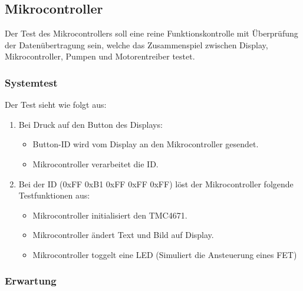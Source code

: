\subsection{Mikrocontroller}\label{subsec:Hardware_Mikrocontroller}
Der Test des Mikrocontrollers soll eine reine Funktionskontrolle mit Überprüfung der Datenübertragung sein, welche das Zusammenspiel zwischen Display, Mikrocontroller, Pumpen und Motorentreiber testet. 

\subsubsection{Systemtest}\label{subsubsec:Hardware_Systemtest}

Der Test sieht wie folgt aus:

\begin{enumerate}
\item Bei Druck auf den Button des Displays:
\begin{itemize}
\item Button-ID wird vom Display an den Mikrocontroller gesendet.
\item Mikrocontroller verarbeitet die ID.
\\
\end{itemize}
\item Bei der ID (0xFF 0xB1 0xFF 0xFF 0xFF) löst der Mikrocontroller folgende Testfunktionen aus:
\begin{itemize}
\item Mikrocontroller initialisiert den TMC4671.
\item Mikrocontroller ändert Text und Bild auf Display.
\item Mikrocontroller toggelt eine LED (Simuliert die Ansteuerung eines FET)
\end{itemize}
\end{enumerate}

\subsubsection{Erwartung}\label{subsubsec:Hardware_Gesamtsystem_Erwartung}

